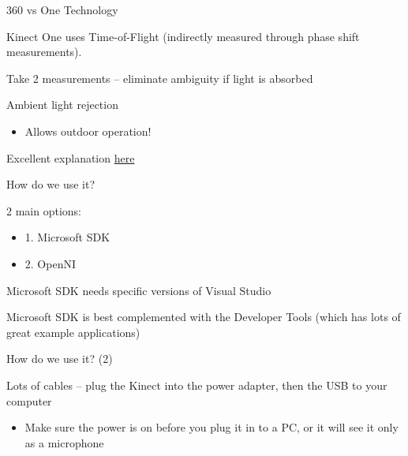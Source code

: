\documentclass[compress]{beamer}
\begin{document}
\begin{frame}{360 vs One Technology}

Kinect One uses Time-of-Flight (indirectly measured through phase shift
measurements).

Take 2 measurements -- eliminate ambiguity if light is absorbed

Ambient light rejection

\begin{itemize}

\item
  Allows outdoor operation!
\end{itemize}

Excellent explanation
\href{http://www.gamasutra.com/blogs/DanielLau/20131127/205820/The_Science_Behind_Kinects_or_Kinect_10_versus_20.php}{here}

\end{frame}

\begin{frame}{How do we use it?}

2 main options:

\begin{itemize}

\item
  1. Microsoft SDK
\item
  2. OpenNI
\end{itemize}

Microsoft SDK needs specific versions of Visual Studio

Microsoft SDK is best complemented with the Developer Tools (which has
lots of great example applications)

\end{frame}

\begin{frame}{How do we use it? (2)}

Lots of cables -- plug the Kinect into the power adapter, then the USB
to your computer

\begin{itemize}

\item
  Make sure the power is on before you plug it in to a PC, or it will
  see it only as a microphone
\end{itemize}

\end{frame}
\end{document}
